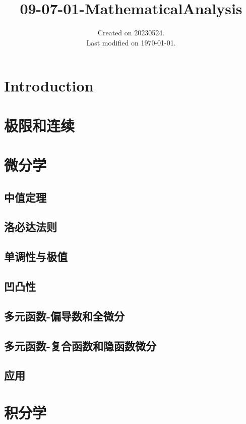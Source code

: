 \documentclass[UTF8]{../../09-Mathematics}
\begin{document}
\title{09-07-01-MathematicalAnalysis}
\date{Created on 20230524.\\   Last modified on \today.}
\maketitle
\tableofcontents


\chapter{Introduction}


\chapter{极限和连续}

\chapter{微分学}

\section{中值定理}
\section{洛必达法则}
\section{单调性与极值}
\section{凹凸性}

\section{多元函数-偏导数和全微分}

\section{多元函数-复合函数和隐函数微分}


\section{应用}




\chapter{积分学}
\end{document}
